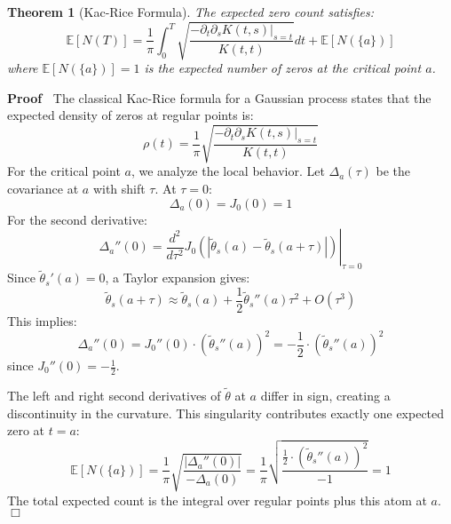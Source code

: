 \documentclass{article}
\newenvironment{proof}{\noindent\textbf{Proof\ }}{\hspace*{\fill}$\Box$\medskip}
\newtheorem{theorem}{Theorem}
\begin{document}
\begin{theorem}
  [Kac-Rice Formula] The expected zero count satisfies:
  \begin{equation}
    \mathbb{E} [N (T)] = \frac{1}{\pi}  \int_0^T \sqrt{\frac{- \partial_t
    \partial_s K (t, s) |_{s = t}}{K (t, t)}} dt +\mathbb{E} [N (\{a\})]
  \end{equation}
  where $\mathbb{E} [N (\{a\})] = 1$ is the expected number of zeros at the
  critical point $a$.
\end{theorem}

\begin{proof}
  The classical Kac-Rice formula for a Gaussian process states that the
  expected density of zeros at regular points is:
  \begin{equation}
    \rho (t) = \frac{1}{\pi}  \sqrt{\frac{- \partial_t \partial_s K (t, s)
    |_{s = t}}{K (t, t)}}
  \end{equation}
  For the critical point $a$, we analyze the local behavior. Let $\Delta_a
  (\tau)$ be the covariance at $a$ with shift $\tau$. At $\tau = 0$:
  \begin{equation}
    \Delta_a (0) = J_0 (0) = 1
  \end{equation}
  For the second derivative:
  \begin{equation}
    \Delta_a'' (0) = \left. \frac{d^2}{d \tau^2} J_0 (| \tilde{\theta}_s (a) -
    \tilde{\theta}_s (a + \tau) |) \right|_{\tau = 0}
  \end{equation}
  Since $\tilde{\theta}_s' (a) = 0$, a Taylor expansion gives:
  \begin{equation}
    \tilde{\theta}_s  (a + \tau) \approx \tilde{\theta}_s (a) + \frac{1}{2} 
    \tilde{\theta}_s'' (a) \tau^2 + O (\tau^3)
  \end{equation}
  This implies:
  \begin{equation}
    \Delta_a'' (0) = J_0'' (0) \cdot (\tilde{\theta}_s'' (a))^2 = -
    \frac{1}{2} \cdot (\tilde{\theta}_s'' (a))^2
  \end{equation}
  since $J_0'' (0) = - \frac{1}{2}$.
  
  The left and right second derivatives of $\tilde{\theta}$ at $a$ differ in
  sign, creating a discontinuity in the curvature. This singularity
  contributes exactly one expected zero at $t = a$:
  \begin{equation}
    \mathbb{E} [N (\{a\})] = \frac{1}{\pi}  \sqrt{\frac{| \Delta_a'' (0) |}{-
    \Delta_a (0)}} = \frac{1}{\pi}  \sqrt{\frac{\frac{1}{2} \cdot
    (\tilde{\theta}_s'' (a))^2}{- 1}} = 1
  \end{equation}
  The total expected count is the integral over regular points plus this atom
  at $a$.
\end{proof}
\end{document}
